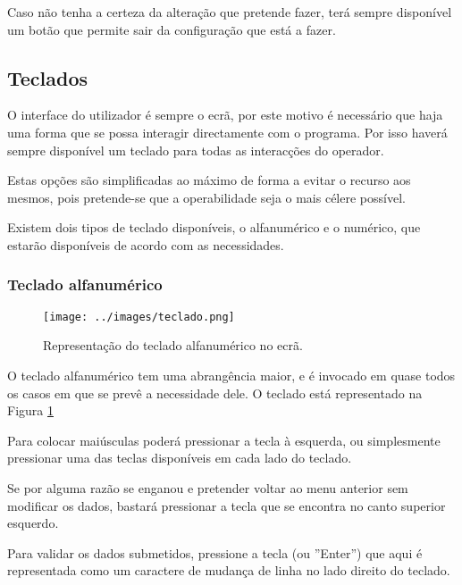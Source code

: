 Caso não tenha a certeza da alteração que pretende fazer, terá sempre 
disponível um botão que permite sair da configuração que está a fazer.





\newpage
\subsection{Teclados}

O interface do utilizador é sempre o ecrã, por este motivo é necessário que 
haja uma forma que se possa interagir directamente com o programa. 
Por isso haverá sempre disponível um teclado para todas as interacções do operador.

Estas opções são simplificadas ao máximo de forma a evitar o recurso aos mesmos,
 pois pretende-se que a operabilidade 
seja o mais célere possível.

Existem dois tipos de teclado disponíveis, o alfanumérico e o numérico, que estarão disponíveis
de acordo com as necessidades.


\subsubsection{Teclado alfanumérico}

\begin{figure}[h]
\begin{center}
\texttt{[image: ../images/teclado.png]}
\caption[Submanifold]{Representação do teclado alfanumérico no ecrã.}
\label{fig:alfanumerico}
\end{center}
\end{figure}



O teclado alfanumérico tem uma abrangência maior, e é invocado em quase todos os casos em
que se prevê a necessidade dele. O teclado está representado na Figura \ref{fig:alfanumerico}

Para colocar maiúsculas poderá pressionar a tecla  à esquerda, ou simplesmente pressionar
uma das teclas  disponíveis em cada lado do teclado.

Se por alguma razão se enganou e pretender voltar ao menu anterior sem modificar os dados, bastará pressionar
a tecla  que se encontra no canto superior esquerdo.

Para validar os dados submetidos, pressione a tecla \keystroke{$\hookleftarrow$} (ou ''Enter'') que aqui é representada como
um caractere de mudança de linha no lado direito do teclado.


